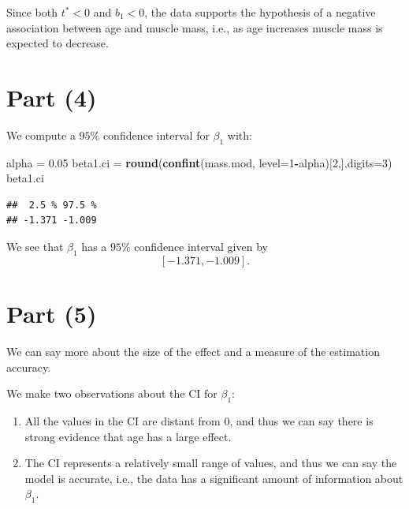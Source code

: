\documentclass[
]{article}
\newenvironment{Shaded}{\begin{snugshade}}{\end{snugshade}}
\newcommand{\AttributeTok}[1]{\textcolor[rgb]{0.13,0.29,0.53}{#1}}
\newcommand{\DecValTok}[1]{\textcolor[rgb]{0.00,0.00,0.81}{#1}}
\newcommand{\FloatTok}[1]{\textcolor[rgb]{0.00,0.00,0.81}{#1}}
\newcommand{\FunctionTok}[1]{\textcolor[rgb]{0.13,0.29,0.53}{\textbf{#1}}}
\newcommand{\NormalTok}[1]{#1}
\newcommand{\OtherTok}[1]{\textcolor[rgb]{0.56,0.35,0.01}{#1}}
\newcommand{\SpecialCharTok}[1]{\textcolor[rgb]{0.81,0.36,0.00}{\textbf{#1}}}
\begin{document}

Since both \(t^* < 0\) and \(b_1 < 0\), the data supports the hypothesis
of a negative association between age and muscle mass, i.e., as age
increases muscle mass is expected to decrease.

\hypertarget{part-4}{%
\section{Part (4)}\label{part-4}}


We compute a \(95\%\) confidence interval for \(\beta_1\) with:

\begin{Shaded}
\begin{Highlighting}[]
\NormalTok{alpha }\OtherTok{=} \FloatTok{0.05}
\NormalTok{beta1.ci }\OtherTok{=} \FunctionTok{round}\NormalTok{(}\FunctionTok{confint}\NormalTok{(mass.mod, }\AttributeTok{level=}\DecValTok{1}\SpecialCharTok{{-}}\NormalTok{alpha)[}\DecValTok{2}\NormalTok{,],}\AttributeTok{digits=}\DecValTok{3}\NormalTok{)}
\NormalTok{beta1.ci}
\end{Highlighting}
\end{Shaded}

\begin{verbatim}
##  2.5 % 97.5 % 
## -1.371 -1.009
\end{verbatim}

We see that \(\beta_1\) has a \(95\%\) confidence interval given by \[
  [-1.371,-1.009].
\]

\hypertarget{part-5}{%
\section{Part (5)}\label{part-5}}


We can say more about the size of the effect and a measure of the
estimation accuracy.

We make two observations about the CI for \(\beta_1\):

\begin{enumerate}
\def\labelenumi{\arabic{enumi}.}
\item
  All the values in the CI are distant from \(0\), and thus we can say
  there is strong evidence that age has a large effect.
\item
  The CI represents a relatively small range of values, and thus we can
  say the model is accurate, i.e., the data has a significant amount of
  information about \(\beta_1\).
\end{enumerate}
\end{document}
